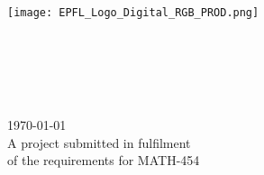 \begin{titlepage}

\center %


\begin{figure*}
    \centering
    \texttt{[image: EPFL\_Logo\_Digital\_RGB\_PROD.png]}\\[1cm] 
\end{figure*}


\makeatletter
{ \huge \bfseries \thesistitle}\\[1.5cm] %
 


\ifdefined\authorid
\authorname\\ %
\authorid\\[2cm] %
\else
\authorname\\[2cm] %
\fi




{\large \today}\\[2cm] %

 
\vfill
 A project submitted in fulfilment\\of the requirements for MATH-454

\vfill %

\end{titlepage}